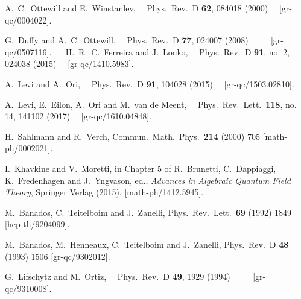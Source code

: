 \documentclass[aps, prd, amsmath, floats, floatfix, twocolumn, nofootinbib, superscriptaddress, showpacs]{revtex4-1}
\begin{document}
\begin{thebibliography}{99}
  A.~C.~Ottewill and E.~Winstanley,
  Phys.\ Rev.\ D {\bf 62}, 084018 (2000)
  [gr-qc/0004022].

  G.~Duffy and A.~C.~Ottewill,
  Phys.\ Rev.\ D {\bf 77}, 024007 (2008)
  [gr-qc/0507116].
  
  H.~R.~C.~Ferreira and J.~Louko,
  Phys.\ Rev.\ D {\bf 91}, no. 2, 024038 (2015)
  [gr-qc/1410.5983].

  A.~Levi and A.~Ori,
  Phys.\ Rev.\ D {\bf 91}, 104028 (2015)
  [gr-qc/1503.02810].

  A.~Levi, E.~Eilon, A.~Ori and M.~van de Meent,
  Phys.\ Rev.\ Lett.\  {\bf 118}, no. 14, 141102 (2017)
  [gr-qc/1610.04848].

H.~Sahlmann and R.~Verch,
Commun.\ Math.\ Phys.\  {\bf 214} (2000) 705
[math-ph/0002021].

  I.~Khavkine and V.~Moretti,
  in Chapter 5 of R.~Brunetti, C.~Dappiaggi, K.~Fredenhagen and J.~Yngvason, ed.,
  	{\it Advances in Algebraic Quantum Field Theory}, 
  	Springer Verlag (2015), 
  	[math-ph/1412.5945].

M.~Banados, C.~Teitelboim and J.~Zanelli,
Phys.\ Rev.\ Lett.\  {\bf 69} (1992) 1849
[hep-th/9204099].

M.~Banados, M.~Henneaux, C.~Teitelboim and J.~Zanelli,
Phys.\ Rev.\ D {\bf 48} (1993) 1506
[gr-qc/9302012].	

  G.~Lifschytz and M.~Ortiz,
  Phys.\ Rev.\ D {\bf 49}, 1929 (1994)
  [gr-qc/9310008].


\end{thebibliography}
\end{document}
